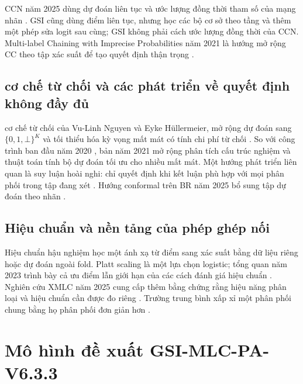 \documentclass[11pt,a4paper]{article}
\begin{document}
CCN năm 2025 dùng dự đoán liên tục và ước lượng đồng thời tham số của mạng nhãn \cite{ccn2025}. GSI cũng dùng điểm liên tục, nhưng học các bộ cơ sở theo tầng và thêm một phép sửa logit sau cùng; GSI không phải cách ước lượng đồng thời của CCN. Multi-label Chaining with Imprecise Probabilities năm 2021 là hướng mở rộng CC theo tập xác suất để tạo quyết định thận trọng \cite{imprecisechain2021}.

\subsection{cơ chế từ chối và các phát triển về quyết định không đầy đủ}
cơ chế từ chối của Vu-Linh Nguyen và Eyke Hüllermeier, mở rộng dự đoán sang $\{0,1,\bot\}^{K}$ và tối thiểu hóa kỳ vọng mất mát có tính chi phí từ chối \cite{nguyen2021}. So với công trình ban đầu năm 2020 \cite{nguyen2020}, bản năm 2021 mở rộng phân tích cấu trúc nghiệm và thuật toán tính bộ dự đoán tối ưu cho nhiều mất mát. Một hướng phát triển liên quan là suy luận hoài nghi: chỉ quyết định khi kết luận phù hợp với mọi phân phối trong tập đang xét \cite{skeptical2021}. Hướng conformal trên BR năm 2025 bổ sung tập dự đoán theo nhãn \cite{conformal2025}.

\subsection{Hiệu chuẩn và nền tảng của phép ghép nối}
Hiệu chuẩn hậu nghiệm học một ánh xạ từ điểm sang xác suất bằng dữ liệu riêng hoặc dự đoán ngoài fold. Platt scaling là một lựa chọn logistic; tổng quan năm 2023 trình bày cả ưu điểm lẫn giới hạn của các cách đánh giá hiệu chuẩn \cite{cal2023}. Nghiên cứu XMLC năm 2025 cung cấp thêm bằng chứng rằng hiệu năng phân loại và hiệu chuẩn cần được đo riêng \cite{xmlcal2025}. Trường trung bình xấp xỉ một phân phối chung bằng họ phân phối đơn giản hơn \cite{meanfield2008}.

\section{Mô hình đề xuất GSI-MLC-PA-V6.3.3}
\end{document}
